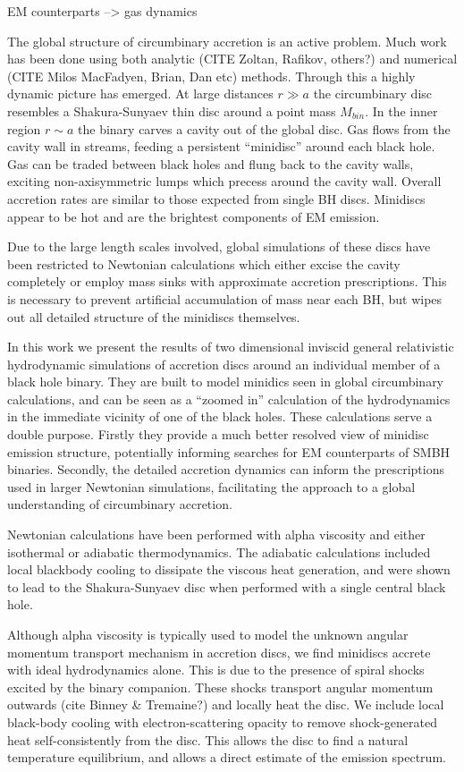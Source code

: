 \documentclass{emulateapj}
\begin{document}
EM counterparts --> gas dynamics

The global structure of circumbinary accretion is an active problem.  Much work has been done using both analytic (CITE Zoltan, Rafikov, others?) and numerical (CITE Milos MacFadyen, Brian, Dan etc) methods. Through this a highly dynamic picture has emerged.  At large distances $r \gg a$ the circumbinary disc resembles a Shakura-Sunyaev thin disc around a point mass $M_{bin}$.  In the inner region $r \sim a$ the binary carves a cavity out of the global disc.  Gas flows from the cavity wall in streams, feeding a persistent ``minidisc'' around each black hole.  Gas can be traded between black holes and flung back to the cavity walls, exciting non-axisymmetric lumps which precess around the cavity wall. Overall accretion rates are similar to those expected from single BH discs.  Minidiscs appear to be hot and are the brightest components of EM emission.

Due to the large length scales involved, global simulations of these discs have been restricted to Newtonian calculations which either excise the cavity completely or employ mass sinks with approximate accretion prescriptions.  This is necessary to prevent artificial accumulation of mass near each BH, but wipes out all detailed structure of the minidiscs themselves.

In this work we present the results of two dimensional inviscid general relativistic hydrodynamic simulations of accretion discs around an individual member of a black hole binary. They are built to model minidics seen in global circumbinary calculations, and can be seen as a ``zoomed in'' calculation of the hydrodynamics in the immediate vicinity of one of the black holes.  These calculations serve a double purpose. Firstly they provide a much better resolved view of minidisc emission structure, potentially informing searches for EM counterparts of SMBH binaries.  Secondly, the detailed accretion dynamics can inform the prescriptions used in larger Newtonian simulations, facilitating the approach to a global understanding of circumbinary accretion.

Newtonian calculations have been performed with alpha viscosity and either isothermal \citep{Farris14} or adiabatic \citep{Farris15A, Farris15B} thermodynamics. The adiabatic calculations included local blackbody cooling to dissipate the viscous heat generation, and were shown to lead to the Shakura-Sunyaev disc when performed with a single central black hole.

Although alpha viscosity is typically used to model the unknown angular 
momentum transport mechanism in accretion discs, we find minidiscs accrete with
ideal hydrodynamics alone.  This is due to the presence of spiral shocks excited by the binary companion. These shocks transport angular momentum outwards (cite Binney \& Tremaine?) and locally heat the disc. We include local 
black-body cooling with electron-scattering opacity to remove shock-generated
heat self-consistently from the disc.  This allows the disc to find a natural
temperature equilibrium, and allows a direct estimate of the emission spectrum.
\end{document}
